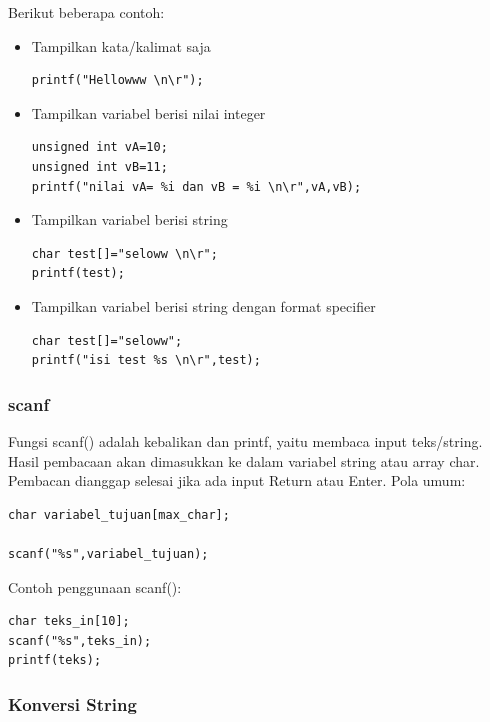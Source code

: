 \documentclass[12pt,]{article}
\begin{document}
	Berikut beberapa contoh:
	\begin{itemize}
		\item Tampilkan kata/kalimat saja
		\begin{verbatim}
printf("Hellowww \n\r");
		\end{verbatim}

		\item Tampilkan variabel berisi nilai integer
		\begin{verbatim}
unsigned int vA=10;
unsigned int vB=11;
printf("nilai vA= %i dan vB = %i \n\r",vA,vB);
		\end{verbatim}

		\item Tampilkan variabel berisi string
		\begin{verbatim}
char test[]="seloww \n\r";
printf(test);
		\end{verbatim}

		\item Tampilkan variabel berisi string dengan format specifier
		\begin{verbatim}
char test[]="seloww";
printf("isi test %s \n\r",test);
		\end{verbatim}
	\end{itemize}

	\subsubsection{scanf}

	Fungsi scanf() adalah kebalikan dan printf, yaitu membaca input teks/string.
	Hasil pembacaan akan dimasukkan ke dalam variabel string atau array char.
	Pembacan dianggap selesai jika ada input Return atau Enter.
	Pola umum:
	\begin{verbatim}
char variabel_tujuan[max_char];

scanf("%s",variabel_tujuan);
	\end{verbatim}

	Contoh penggunaan scanf():
	\begin{verbatim}
char teks_in[10];
scanf("%s",teks_in);
printf(teks);
	\end{verbatim}

	\subsubsection{Konversi String}
\end{document}
